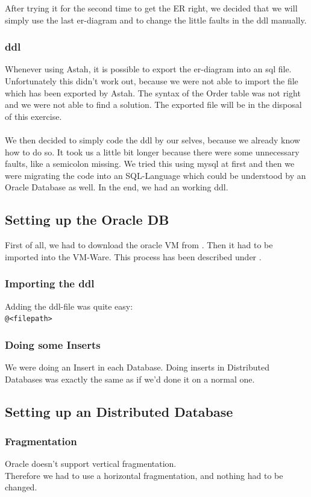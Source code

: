 \documentclass[12pt]{article}
\begin{document}
After trying it for the second time to get the ER right, we decided that we will simply use the last \gls{er}-diagram and to change the little faults in the \gls{ddl} manually.
	
\subsubsection{\gls{ddl}}
Whenever using Astah, it is possible to export the \gls{er}-diagram into an \gls{sql} file. \\
Unfortunately this didn't work out, because we were not able to import the file which has been exported by Astah.
The syntax of the Order table was not right and we were not able to find a solution. The exported file will be in the disposal of this exercise. \\ \\
We then decided to simply code the \gls{ddl} by our selves, because we already know how to do so. It took us a little bit longer because there were some unnecessary faults, like a semicolon missing. We tried this using mysql at first and then we were migrating the code into an SQL-Language which could be understood by an Oracle Database as well.
In the end, we had an working \gls{ddl}.
\subsection{Setting up the Oracle DB}
First of all, we had to download the oracle VM from \cite{oraclevm}. Then it had to be imported into the VM-Ware. This process has been described under \cite{oraclevm2}.\\
\subsubsection{Importing the \gls{ddl}}
Adding the \gls{ddl}-file was quite easy:  \\
\texttt{@<filepath>} 
\subsubsection{Doing some Inserts}
We were doing an Insert in each Database. 
Doing inserts in Distributed Databases was exactly the same as if we'd done it on a normal one. 
\subsection{Setting up an Distributed Database}
\subsubsection{Fragmentation}
Oracle doesn't support vertical fragmentation. \\ Therefore we had to use a horizontal fragmentation, and nothing had to be changed.
\end{document}
